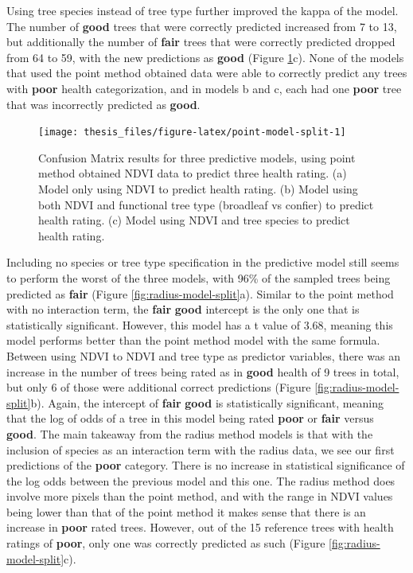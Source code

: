 \documentclass[12pt,twoside]{reedthesis}
\begin{document}
Using tree species instead of tree type further improved the kappa of the model. The number of \textbf{good} trees that were correctly predicted increased from 7 to 13, but additionally the number of \textbf{fair} trees that were correctly predicted dropped from 64 to 59, with the new predictions as \textbf{good} (Figure \ref{fig:point-model-split}c). None of the models that used the point method obtained data were able to correctly predict any trees with \textbf{poor} health categorization, and in models b and c, each had one \textbf{poor} tree that was incorrectly predicted as \textbf{good}.
\begin{figure}

{\centering \texttt{[image: thesis\_files/figure-latex/point-model-split-1]} 

}

\caption[Confusion matrixes for Point method predictive models]{Confusion Matrix results for three predictive models, using point method obtained NDVI data to predict three health rating. (a) Model only using NDVI to predict health rating. (b) Model using both NDVI and functional tree type (broadleaf vs confier) to predict health rating. (c) Model using NDVI and tree species to predict health rating.}\label{fig:point-model-split}
\end{figure}
Including no species or tree type specification in the predictive model still seems to perform the worst of the three models, with 96\% of the sampled trees being predicted as \textbf{fair} (Figure \ref{fig:radius-model-split}a). Similar to the point method with no interaction term, the \textbf{fair} \textbar{} \textbf{good} intercept is the only one that is statistically significant. However, this model has a t value of 3.68, meaning this model performs better than the point method model with the same formula.
Between using NDVI to NDVI and tree type as predictor variables, there was an increase in the number of trees being rated as in \textbf{good} health of 9 trees in total, but only 6 of those were additional correct predictions (Figure \ref{fig:radius-model-split}b). Again, the intercept of \textbf{fair} \textbar{} \textbf{good} is statistically significant, meaning that the log of odds of a tree in this model being rated \textbf{poor} or \textbf{fair} versus \textbf{good}. The main takeaway from the radius method models is that with the inclusion of species as an interaction term with the radius data, we see our first predictions of the \textbf{poor} category. There is no increase in statistical significance of the log odds between the previous model and this one. The radius method does involve more pixels than the point method, and with the range in NDVI values being lower than that of the point method it makes sense that there is an increase in \textbf{poor} rated trees. However, out of the 15 reference trees with health ratings of \textbf{poor}, only one was correctly predicted as such (Figure \ref{fig:radius-model-split}c).
\end{document}

